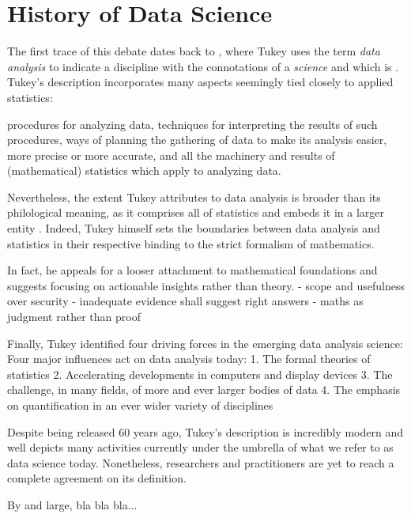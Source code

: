 \section{History of Data Science}
\label{chap:historyDS}

The first trace of this debate dates back to \cite{tukey1962future}, where Tukey uses the term \emph{data analysis} to indicate a discipline with the connotations of a \emph{science} and which is . 
Tukey's description incorporates many aspects seemingly tied closely to applied statistics: 
\begin{displayquote}
procedures for analyzing data, techniques for interpreting the results of such procedures, ways of planning the gathering of data to make its analysis easier, more precise or more accurate, and all the machinery and results of (mathematical) statistics which apply to analyzing data.
\end{displayquote}
Nevertheless, the extent Tukey attributes to data analysis is broader than its philological meaning, as it comprises all of statistics and embeds it in a larger entity \cite{huber2012data, donoho201750years}.
Indeed, Tukey himself sets the boundaries between data analysis and statistics in their respective binding to the strict formalism of mathematics.

In fact, he appeals for a looser attachment to mathematical foundations and suggests focusing on actionable insights rather than theory.
 - scope and usefulness over security
 - inadequate evidence shall suggest right answers
 - maths as judgment rather than proof
 
Finally, Tukey identified four driving forces in the emerging data analysis science:
Four major influences act on data analysis today:
1. The formal theories of statistics
2. Accelerating developments in computers and display devices
3. The challenge, in many fields, of more and ever larger bodies of data
4. The emphasis on quantification in an ever wider variety of disciplines

Despite being released 60 years ago, Tukey's description is incredibly modern and well depicts many activities currently under the umbrella of what we refer to as data science today.
Nonetheless, researchers and practitioners are yet to reach a complete agreement on its definition.

By and large, bla bla bla...